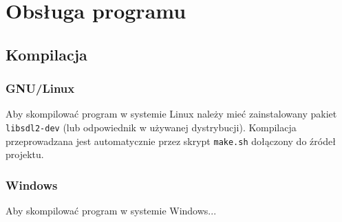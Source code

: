 \documentclass[12pt,a4paper]{article}
\newcommand{\code}[1]{\texttt{#1}}
\begin{document}
	

	\section{Obsługa programu}
		\subsection{Kompilacja}
			\subsubsection{GNU/Linux}
				Aby skompilować program w systemie Linux należy mieć zainstalowany pakiet \code{libsdl2-dev} (lub odpowiednik w używanej dystrybucji).
				Kompilacja przeprowadzana jest automatycznie przez skrypt \code{make.sh} dołączony do źródeł projektu.
			\subsubsection{Windows}
				Aby skompilować program w systemie Windows...
\end{document}
